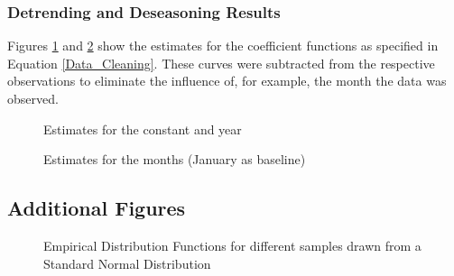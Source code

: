 \documentclass[12pt, a4paper]{article}
\theoremstyle{MAstyle} \newtheorem{assumption}{Assumption}[section]
\theoremstyle{MAstyle} \newtheorem{definition}{Definition}[section]
\theoremstyle{MAstyle} \newtheorem{theorem}{Theorem}[section]
\begin{document}
			\subsubsection{Detrending and Deseasoning Results}\label{detrending}
			Figures \ref{estimates_const_year} and \ref{estimates_months} show the estimates for the coefficient functions as specified in Equation \ref{Data_Cleaning}. These curves were subtracted from the respective observations to eliminate the influence of, for example, the month the data was observed.
			\begin{figure}[H]
				\caption{Estimates for the constant and year}
				\label{estimates_const_year}
			\end{figure}
			
			\begin{figure}[H]
				\caption{Estimates for the months (January as baseline)}
				\label{estimates_months}
			\end{figure}
			
		\subsection{Additional Figures}\label{add_figures}
			\begin{figure}[H]
				\caption{Empirical Distribution Functions for different samples drawn from a Standard Normal Distribution}
				\label{ecdf_plot}
			\end{figure}
		
\end{document}
